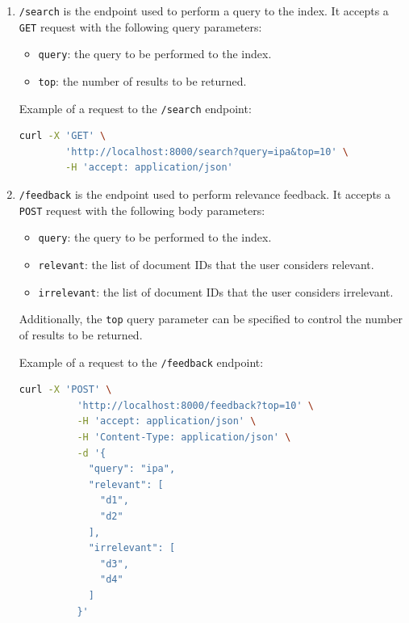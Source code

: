 \begin{enumerate}
  \item \texttt{/search} is the endpoint used to perform a query to the index. It accepts a \texttt{GET} request with the following query parameters:

        \begin{itemize}
          \item \texttt{query}: the query to be performed to the index.
          \item \texttt{top}: the number of results to be returned.
        \end{itemize}

        Example of a request to the \texttt{/search} endpoint:

        \begin{lstlisting}[language=bash]
      curl -X 'GET' \
        'http://localhost:8000/search?query=ipa&top=10' \
        -H 'accept: application/json'
    \end{lstlisting}

  \item \texttt{/feedback} is the endpoint used to perform relevance feedback. It accepts a \texttt{POST} request with the following body parameters:

        \begin{itemize}
          \item \texttt{query}: the query to be performed to the index.
          \item \texttt{relevant}: the list of document IDs that the user considers relevant.
          \item \texttt{irrelevant}: the list of document IDs that the user considers irrelevant.
        \end{itemize}

        Additionally, the \texttt{top} query parameter can be specified to control the number of results to be returned.

        Example of a request to the \texttt{/feedback} endpoint:

        \begin{lstlisting}[language=bash]
        curl -X 'POST' \
          'http://localhost:8000/feedback?top=10' \
          -H 'accept: application/json' \
          -H 'Content-Type: application/json' \
          -d '{
            "query": "ipa",
            "relevant": [
              "d1",
              "d2"
            ],
            "irrelevant": [
              "d3",
              "d4"
            ]
          }'
        \end{lstlisting}
\end{enumerate}

